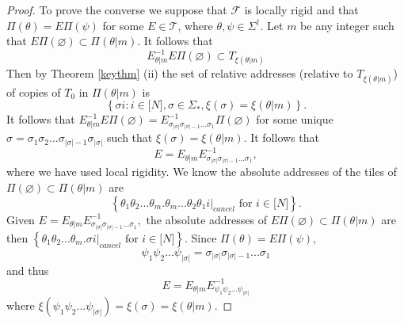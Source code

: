 \documentclass{amsproc}
\theoremstyle{plain}
\theoremstyle{definition}
\numberwithin{equation}{section}
\begin{document}
\begin{proof}
To prove the converse we suppose that $\mathcal{F}$ is locally rigid and
that $\Pi(\theta)=E\Pi(\psi)$ for some $E\in\mathcal{T}$, where $\theta,\psi
\in\Sigma^{\dag}$. Let $m$ be any integer such that $E\Pi(\varnothing
)\subset\Pi(\theta|m).$ It follows that 
\begin{equation*}
E_{\theta|m}^{-1}E\Pi(\varnothing)\subset T_{\xi(\theta|m)}
\end{equation*}
Then by Theorem \ref{keythm} (ii) the set of relative addresses (relative to 
$T_{\xi(\theta|m)}$) of copies of $T_{0}$ in $\Pi(\theta|m)$ is 
\begin{equation*}
\left\{ \sigma i:i\in\lbrack N],\sigma\in\Sigma_{\ast},\xi(\sigma)=\xi
(\theta|m)\right\} .
\end{equation*}
It follows that $E_{\theta|m}^{-1}E\Pi(\varnothing)=E_{\sigma_{|\sigma|}%
\sigma_{|\sigma|-1}...\sigma_{1}}^{-1}\Pi(\varnothing)$ for some unique $%
\sigma=\sigma_{1}\sigma_{2}...\sigma_{|\sigma|-1}\sigma_{|\sigma|}$ such
that $\xi(\sigma)=\xi(\theta|m).$ It follows that 
\begin{equation*}
E=E_{\theta|m}E_{\sigma_{|\sigma|}\sigma_{|\sigma|-1}...\sigma_{1}}^{-1},
\end{equation*}
where we have used local rigidity. We know the absolute addresses of the
tiles of $\Pi(\varnothing)\subset\Pi(\theta|m)$ are 
\begin{equation*}
\left\{ \theta_{1}\theta_{2}...\theta_{m}.\theta_{m}...\theta_{2}\theta
_{1}i|_{cancel}\text{ for }i\in\lbrack N]\right\} .
\end{equation*}
Given $E=E_{\theta|m}E_{\sigma_{|\sigma|}\sigma_{|\sigma|-1}...%
\sigma_{1}}^{-1},$ the absolute addresses of $E\Pi(\varnothing)\subset\Pi(%
\theta|m)$ are then $\left\{ \theta_{1}\theta_{2}...\theta_{m}.\sigma
i|_{cancel}\text{ for }i\in\lbrack N]\right\} .$ Since $\Pi(\theta)=E\Pi(%
\psi),$ 
\begin{equation*}
\psi_{1}\psi_{2}...\psi_{\left\vert \sigma\right\vert }=\sigma_{\left\vert
\sigma\right\vert }\sigma_{\left\vert \sigma\right\vert -1}...\sigma_{1}
\end{equation*}
and thus 
\begin{equation*}
E=E_{\theta|m}E_{\psi_{1}\psi_{2}...\psi_{\left\vert \sigma\right\vert
}}^{-1}
\end{equation*}
where $\xi\left( \psi_{1}\psi_{2}...\psi_{\left\vert \sigma\right\vert
}\right) =\xi\left( \sigma\right) =\xi(\theta|m)$.


\end{proof}
\end{document}
